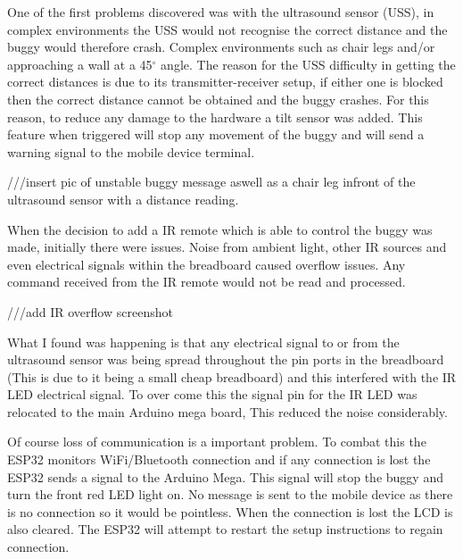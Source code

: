 \documentclass[8pt, a4paper]{article}
\begin{document}
One of the first problems discovered was with the ultrasound sensor (USS), in complex environments the USS would not recognise the correct distance and the buggy would therefore crash. Complex environments such as chair legs and/or approaching a wall at a 45$^{\circ}$ angle. The reason for the USS difficulty in getting the correct distances is due to its transmitter-receiver setup, if either one is blocked then the correct distance cannot be obtained and the buggy crashes. For this reason, to reduce any damage to the hardware a tilt sensor was added. This feature when triggered will stop any movement of the buggy and will send a warning signal to the mobile device terminal. 

///insert pic of unstable buggy message aswell as a chair leg infront of the ultrasound sensor with a distance reading. 

 
When the decision to add a IR remote which is able to control the buggy was made, initially there were issues. Noise from ambient light, other IR sources and even electrical signals within the breadboard caused overflow issues. Any command received from the IR remote would not be read and processed. 

///add IR overflow screenshot 

What I found was happening is that any electrical signal to or from the ultrasound sensor was being spread throughout the pin ports in the breadboard (This is due to it being a small cheap breadboard) and this interfered with the IR LED electrical signal. To over come this the signal pin for the IR LED was relocated to the main Arduino mega board, This reduced the noise considerably.  


Of course loss of communication is a important problem. To combat this the ESP32 monitors WiFi/Bluetooth connection and if any connection is lost the ESP32 sends a signal to the Arduino Mega. This signal will stop the buggy and turn the front red LED light on. No message is sent to the mobile device as there is no connection so it would be pointless. When the connection is lost the LCD is also cleared. The ESP32 will attempt to restart the setup instructions to regain connection. 
\end{document}
